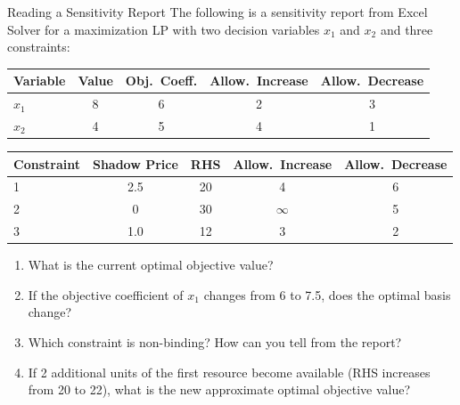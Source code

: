 \begin{ex}{Reading a Sensitivity Report}{}
 The following is a sensitivity report from Excel Solver for a maximization LP with two decision variables $x_1$ and $x_2$ and three constraints:

\begin{center}
\renewcommand{\arraystretch}{1.3}
\begin{tabular}{@{}lcccc@{}}
\toprule
\textbf{Variable} & \textbf{Value} & \textbf{Obj.\ Coeff.} & \textbf{Allow.\ Increase} & \textbf{Allow.\ Decrease} \\
\midrule
$x_1$ & 8 & 6 & 2 & 3 \\
$x_2$ & 4 & 5 & 4 & 1 \\
\bottomrule
\end{tabular}
\par{}\label{tab:sensitivity-LP-tab03}%

\end{center}

\begin{center}
\renewcommand{\arraystretch}{1.3}
\begin{tabular}{@{}lcccc@{}}
\toprule
\textbf{Constraint} & \textbf{Shadow Price} & \textbf{RHS} & \textbf{Allow.\ Increase} & \textbf{Allow.\ Decrease} \\
\midrule
1 & 2.5 & 20 & 4 & 6 \\
2 & 0 & 30 & $\infty$ & 5 \\
3 & 1.0 & 12 & 3 & 2 \\
\bottomrule
\end{tabular}
\par{}\label{tab:sensitivity-LP-tab04}%

\end{center}

\begin{enumerate}
\item What is the current optimal objective value?
\item If the objective coefficient of $x_1$ changes from 6 to 7.5, does the optimal basis change?
\item Which constraint is non-binding? How can you tell from the report?
\item If 2 additional units of the first resource become available (RHS increases from 20 to 22), what is the new approximate optimal objective value?
\end{enumerate}
\exrefs{\S\ref{sec:sensitivity-software}}
\end{ex}

